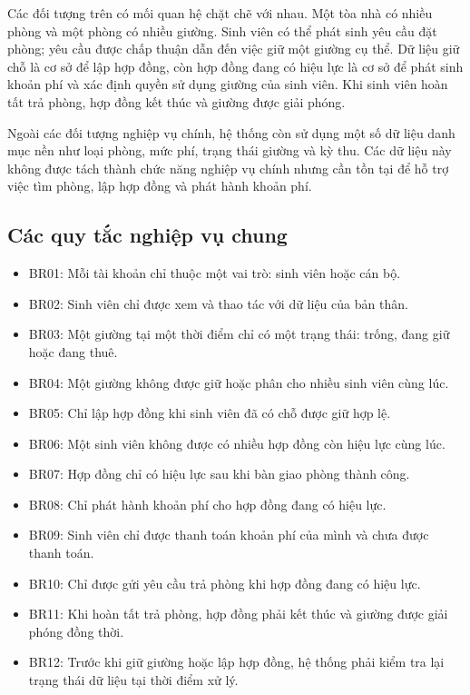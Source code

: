 Các đối tượng trên có mối quan hệ chặt chẽ với nhau. Một tòa nhà có nhiều phòng và một phòng có nhiều giường. Sinh viên có thể phát sinh yêu cầu đặt phòng; yêu cầu được chấp thuận dẫn đến việc giữ một giường cụ thể. Dữ liệu giữ chỗ là cơ sở để lập hợp đồng, còn hợp đồng đang có hiệu lực là cơ sở để phát sinh khoản phí và xác định quyền sử dụng giường của sinh viên. Khi sinh viên hoàn tất trả phòng, hợp đồng kết thúc và giường được giải phóng.

Ngoài các đối tượng nghiệp vụ chính, hệ thống còn sử dụng một số dữ liệu danh mục nền như loại phòng, mức phí, trạng thái giường và kỳ thu. Các dữ liệu này không được tách thành chức năng nghiệp vụ chính nhưng cần tồn tại để hỗ trợ việc tìm phòng, lập hợp đồng và phát hành khoản phí.

\subsection{Các quy tắc nghiệp vụ chung}

\begin{itemize}[leftmargin=1.4em]
\item BR01: Mỗi tài khoản chỉ thuộc một vai trò: sinh viên hoặc cán bộ.
\item BR02: Sinh viên chỉ được xem và thao tác với dữ liệu của bản thân.
\item BR03: Một giường tại một thời điểm chỉ có một trạng thái: trống, đang giữ hoặc đang thuê.
\item BR04: Một giường không được giữ hoặc phân cho nhiều sinh viên cùng lúc.
\item BR05: Chỉ lập hợp đồng khi sinh viên đã có chỗ được giữ hợp lệ.
\item BR06: Một sinh viên không được có nhiều hợp đồng còn hiệu lực cùng lúc.
\item BR07: Hợp đồng chỉ có hiệu lực sau khi bàn giao phòng thành công.
\item BR08: Chỉ phát hành khoản phí cho hợp đồng đang có hiệu lực.
\item BR09: Sinh viên chỉ được thanh toán khoản phí của mình và chưa được thanh toán.
\item BR10: Chỉ được gửi yêu cầu trả phòng khi hợp đồng đang có hiệu lực.
\item BR11: Khi hoàn tất trả phòng, hợp đồng phải kết thúc và giường được giải phóng đồng thời.
\item BR12: Trước khi giữ giường hoặc lập hợp đồng, hệ thống phải kiểm tra lại trạng thái dữ liệu tại thời điểm xử lý.
\end{itemize}

